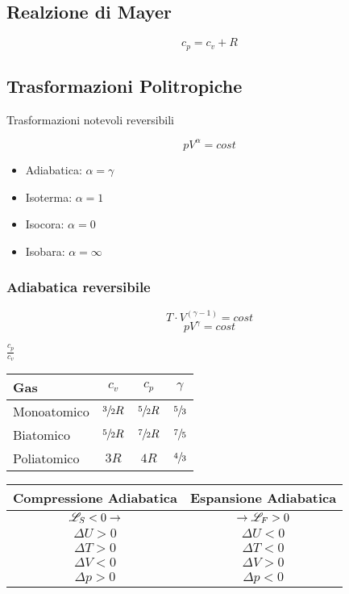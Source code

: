 

\subsection{Realzione di Mayer}
\begin{equation}
    c_p = c_v + R
\end{equation}

\subsection{Trasformazioni Politropiche}
Trasformazioni notevoli reversibili

\[
pV^\alpha = cost
\]

\begin{itemize}
    \item Adiabatica: $\alpha = \gamma $
    \item Isoterma: $\alpha = 1$
    \item Isocora: $\alpha = 0$
    \item Isobara: $\alpha = \infty$
\end{itemize}

\subsubsection{Adiabatica reversibile}
\begin{equation}
    T \cdot V ^{(\gamma - 1)} = cost
\end{equation}
\begin{equation}
    p V ^{\gamma} = cost
\end{equation}

\Def{$\gamma$} $\frac{c_p}{c_v}$
\begin{center}
\begin{tabular}{| l | c | c | c |}
    \hline
    \textbf{Gas} & \textbf{$c_v$} & \textbf{$c_p$} & \textbf{$\gamma$} \\
    \hline
    Monoatomico & $\sfrac{3}{2} R$ & $\sfrac{5}{2} R$ & $\sfrac{5}{3}$\\
    Biatomico & $\sfrac{5}{2} R$ & $\sfrac{7}{2} R$ & $\sfrac{7}{5}$\\
    Poliatomico & $3 R$ & $4 R$ & $\sfrac{4}{3}$\\
    \hline
\end{tabular}
\end{center}

\begin{center}
\begin{tabular}{| c | c |}
    \hline
    \textbf{Compressione Adiabatica} & \textbf{Espansione Adiabatica} \\
    \hline
    $\mathscr{L}_S < 0 \to$ & $ \to \mathscr{L}_F > 0$ \\
    \hline
    $\Delta U > 0$ & $\Delta U < 0$\\
    $\Delta T > 0$ & $\Delta T < 0$\\
    $\Delta V < 0$ & $\Delta V > 0$\\
    $\Delta p > 0$ & $\Delta p < 0$\\
    \hline
\end{tabular}
\end{center}

